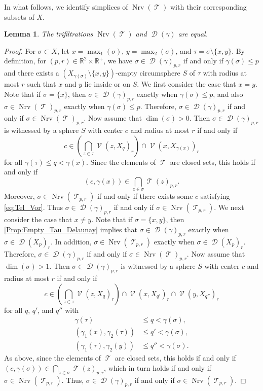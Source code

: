 \documentclass[11pt]{amsart}
\newcommand{\R}{\mathbb{R}} %
\DeclareMathOperator{\Nrv}{Nrv}
\DeclareMathOperator{\V}{\mathcal{V}}
\DeclareMathOperator{\Del}{\mathcal{D}}
\DeclareMathOperator{\TelVor}{\mathcal{T}}
\theoremstyle{plain}
\newtheorem{lemma}[theorem]{Lemma}
\theoremstyle{definition}
\theoremstyle{remark}
\begin{document}
%
In what follows, we identify simplices of $\Nrv(\TelVor)$ with their  corresponding subsets of $X$. 
\begin{lemma}\label{thm:deleq}
The trifiltrations $\Nrv(\TelVor)$ and  $\Del(\gamma)$ are equal.  
\end{lemma}
\begin{proof}
For $\sigma\subset X$, let $x=\max_1(\sigma)$,  $y=\max_{2}(\sigma)$, and $\tau=\sigma\setminus \{x,y\}$.  
By definition, for $(p,r)\in \R^2\times \R^+$, we have $\sigma \in \Del(\gamma)_{p,r}$ if and only if  $\gamma(\sigma)\leq p$ and there exists a $(X_{\gamma(\sigma)}\setminus \{x,y\})$-empty circumsphere $S$ of $\tau$ with radius at most $r$ such that $x$ and $y$ lie inside or on $S$.  
%
We first consider the case that $x=y$.  Note that if $\sigma=\{x\}$, then $\sigma\in \Del(\gamma)_{p,r}$ exactly when $\gamma(\sigma)\leq p$, and also $\sigma\in \Nrv(\TelVor)_{p,r}$ exactly when $\gamma(\sigma)\leq p$.  Therefore, $\sigma\in  \Del(\gamma)_{p,r}$ if and only if  $\sigma\in \Nrv(\TelVor)_{p,r}$.  Now assume that  $\dim(\sigma)>0$.  Then $\sigma \in \Del(\gamma)_{p,r}$ is witnessed by a sphere $S$ with center $c$ and radius at most $r$ if and only if 
\[c\in \left(\bigcap_{z\in \tau} \V(z,X_{q})_r\right)\cap \V(x,X_{\gamma(x)})_r\]
for all $\gamma(\tau) \leq q< \gamma(x)$.  Since the elements of $\TelVor$ are closed sets, this holds if and only if 
\begin{equation}\label{eq:Tel_Vor}
(c,\gamma(x))\in \bigcap_{z\in \sigma} \TelVor(z)_{p,r}.
\end{equation}
 Moreover, $\sigma\in \Nrv(\TelVor_{p,r})$ if and only if there exists some $c$ satisfying \eqref{eq:Tel_Vor}.  Thus $\sigma\in  \Del(\gamma)_{p,r}$ if and only if $\sigma\in \Nrv(\TelVor_{p,r})$.
%
We next consider the case that $x\ne y$.  Note that if $\sigma=\{x,y\}$, then \cref{Prop:Empty_Tau_Delaunay} implies that $\sigma\in \Del(\gamma)_{p,r}$ exactly when $\sigma\in \Del(X_{p})_r$.  In addition, $\sigma\in \Nrv(\TelVor_{p,r})$ exactly when $\sigma\in \Del(X_{p})_r$.   Therefore, $\sigma\in  \Del(\gamma)_{p,r}$ if and only if  $\sigma\in \Nrv(\TelVor)_{p,r}$.  Now assume that  $\dim(\sigma)>1$.  Then $\sigma \in \Del(\gamma)_{p,r}$ is witnessed by a sphere $S$ with center $c$ and radius at most $r$ if and only if 
\[c\in \left(\bigcap_{z\in \tau} \V(z,X_{q})_r\right)\cap \V(x,X_{q'})_r \cap  \V(y,X_{q''})_r\]
for all $q$, $q'$, and $q''$ with 
\begin{align*}
\gamma(\tau) &\leq q< \gamma(\sigma),\\
(\gamma_1(x),\gamma_2(\tau))&\leq q'< \gamma(\sigma),\\
(\gamma_1(\tau),\gamma_2(y))&\leq q''< \gamma(\sigma).
\end{align*}
As above, since the elements of $\TelVor$ are closed sets, this holds if and only if $(c,\gamma(\sigma))\in \bigcap_{z\in \sigma} \TelVor(z)_{p,r}$, which in turn holds if and only if $\sigma \in  \Nrv(\TelVor_{p,r})$.  Thus, $\sigma\in  \Del(\gamma)_{p,r}$ if and only if $\sigma\in \Nrv(\TelVor_{p,r})$.
\end{proof}
\end{document}
